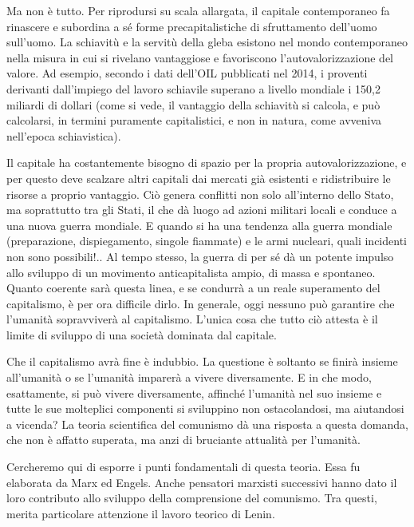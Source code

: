 \documentclass[12pt,a4paper,openany]{book}
\begin{document}
Ma non è tutto. Per riprodursi su scala allargata, il capitale contemporaneo fa rinascere e subordina a sé forme precapitalistiche di sfruttamento dell'uomo sull'uomo. La schiavitù e la servitù della gleba esistono nel mondo contemporaneo nella misura in cui si rivelano vantaggiose e favoriscono l'autovalorizzazione del valore. Ad esempio, secondo i dati dell'OIL pubblicati nel 2014, i proventi derivanti dall'impiego del lavoro schiavile superano a livello mondiale i 150,2 miliardi di dollari (come si vede, il vantaggio della schiavitù si calcola, e può calcolarsi, in termini puramente capitalistici, e non in natura, come avveniva nell'epoca schiavistica).

Il capitale ha costantemente bisogno di spazio per la propria autovalorizzazione, e per questo deve scalzare altri capitali dai mercati già esistenti e ridistribuire le risorse a proprio vantaggio. Ciò genera conflitti non solo all'interno dello Stato, ma soprattutto tra gli Stati, il che dà luogo ad azioni militari locali e conduce a una nuova guerra mondiale. E quando si ha una tendenza alla guerra mondiale (preparazione, dispiegamento, singole fiammate) e le armi nucleari, quali incidenti non sono possibili!.. Al tempo stesso, la guerra di per sé dà un potente impulso allo sviluppo di un movimento anticapitalista ampio, di massa e spontaneo. Quanto coerente sarà questa linea, e se condurrà a un reale superamento del capitalismo, è per ora difficile dirlo. In generale, oggi nessuno può garantire che l'umanità sopravviverà al capitalismo. L'unica cosa che tutto ciò attesta è il limite di sviluppo di una società dominata dal capitale.

Che il capitalismo avrà fine è indubbio. La questione è soltanto se finirà insieme all'umanità o se l'umanità imparerà a vivere diversamente. E in che modo, esattamente, si può vivere diversamente, affinché l'umanità nel suo insieme e tutte le sue molteplici componenti si sviluppino non ostacolandosi, ma aiutandosi a vicenda? La teoria scientifica del comunismo dà una risposta a questa domanda, che non è affatto superata, ma anzi di bruciante attualità per l'umanità.

Cercheremo qui di esporre i punti fondamentali di questa teoria. Essa fu elaborata da Marx ed Engels. Anche pensatori marxisti successivi hanno dato il loro contributo allo sviluppo della comprensione del comunismo. Tra questi, merita particolare attenzione il lavoro teorico di Lenin.
\end{document}
